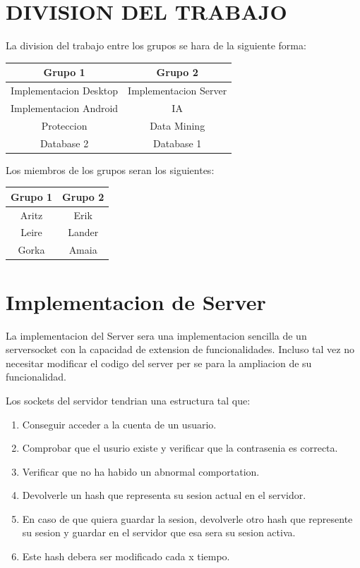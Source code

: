 \documentclass{article}
\theoremstyle{definition}
\begin{document}
\section{DIVISION DEL TRABAJO}

La division del trabajo entre los grupos se hara de la siguiente forma:

\begin{center}
\begin{tabular}{|c|c|}
    \hline Grupo 1 & Grupo 2 \\
    \hline Implementacion Desktop & Implementacion Server \\
    Implementacion Android & IA \\
    Proteccion & Data Mining \\
    Database 2 & Database 1 \\
    \hline
\end{tabular}
\end{center}\smallskip

Los miembros de los grupos seran los siguientes:

\begin{center}
\begin{tabular}{|c|c|}
    \hline
    Grupo 1  & Grupo 2 \\
    \hline
    Aritz & Erik \\
    Leire & Lander \\
    Gorka & Amaia \\
    \hline
\end{tabular}
\end{center}




\section{Implementacion de Server}


La implementacion del Server sera una implementacion sencilla de un serversocket con la capacidad de extension de funcionalidades. Incluso tal vez no necesitar modificar el codigo del server per se para la ampliacion de su funcionalidad. 

Los sockets del servidor tendrian una estructura tal que:
\begin{enumerate}
    \item Conseguir acceder a la cuenta de un usuario.
    \item Comprobar que el usurio existe y verificar que la contrasenia es correcta.
    \item Verificar que no ha habido un abnormal comportation.
    \item Devolverle un hash que representa su sesion actual en el servidor.
    \item En caso de que quiera guardar la sesion, devolverle otro hash que represente su sesion y guardar en el servidor que esa sera su sesion activa.
    \item Este hash debera ser modificado cada x tiempo.
\end{enumerate}
\end{document}
